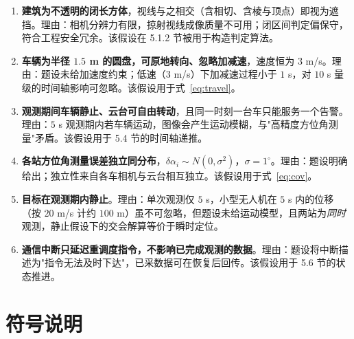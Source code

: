 \documentclass[UTF8,a4paper,zihao=-4,oneside]{ctexart}
\begin{document}
\begin{enumerate}[leftmargin=2em]
  \item \textbf{建筑为不透明的闭长方体}，视线与之相交（含相切、含棱与顶点）即视为遮挡。理由：相机分辨力有限，掠射视线成像质量不可用；闭区间判定偏保守，符合工程安全冗余。该假设在 5.1.2 节被用于构造判定算法。
  \item \textbf{车辆为半径 $1.5$ m 的圆盘，可原地转向、忽略加减速}，速度恒为 $3$ m/s。理由：题设未给加速度约束；低速（$3$ m/s）下加减速过程小于 $1$ s，对 $10$ s 量级的时间轴影响可忽略。该假设用于式~\eqref{eq:travel}。
  \item \textbf{观测期间车辆静止、云台可自由转动}，且同一时刻一台车只能服务一个告警。理由：$5$ s 观测期内若车辆运动，图像会产生运动模糊，与"高精度方位角测量"矛盾。该假设用于 5.4 节的时间轴递推。
  \item \textbf{各站方位角测量误差独立同分布}，$\delta\alpha_i\sim N(0,\sigma^2)$，$\sigma=1^\circ$。理由：题设明确给出；独立性来自各车相机与云台相互独立。该假设用于式~\eqref{eq:cov}。
  \item \textbf{目标在观测期内静止}。理由：单次观测仅 $5$ s，小型无人机在 $5$ s 内的位移（按 $20$ m/s 计约 $100$ m）虽不可忽略，但题设未给运动模型，且两站为\emph{同时}观测，静止假设下的交会解算等价于瞬时定位。
  \item \textbf{通信中断只延迟重调度指令，不影响已完成观测的数据}。理由：题设将中断描述为"指令无法及时下达"，已采数据可在恢复后回传。该假设用于 5.6 节的状态推进。
\end{enumerate}

\section{符号说明}
\end{document}
